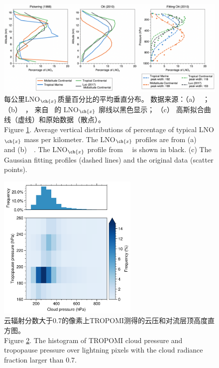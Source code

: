 \begin{figure}[H]
\centering
\includegraphics[width=\textwidth]{./figures/arctic_lnox_profile.png}
\caption{
每公里LNO$_{\ch{x}}$质量百分比的平均垂直分布。
数据来源：（a）\  \citet{Pickering.1998}；（b）\  \citet{Ott.2010}，
来自\  \citet{Luo.2017} 的 LNO$_{\ch{x}}$ 廓线以黑色显示；
（c） 高斯拟合曲线（虚线）和原始数据（散点）。\\
Figure \ref{fig:arctic_lnox_profile}.
Average vertical distributions of percentage of typical LNO$_{\ch{x}}$ mass per kilometer.
The LNO$_{\ch{x}}$ profiles are from (a)\ \ \citet{Pickering.1998} and (b)\ \ \citet{Ott.2010}.
The LNO$_{\ch{x}}$ profile from\ \ \citet{Luo.2017} is shown in black.
(c)  The Gaussian fitting profiles (dashed lines) and the original data (scatter points).
}
\label{fig:arctic_lnox_profile}
\end{figure}

\begin{figure}[H]
\centering
\includegraphics[width=0.6\textwidth]{./figures/pcld_ptropo.png}
\caption{云辐射分数大于0.7的像素上TROPOMI测得的云压和对流层顶高度直方图。\\
Figure \ref{fig:pcld_ptropo}. The histogram of TROPOMI cloud pressure and tropopause pressure over lightning
pixels with the cloud radiance fraction larger than 0.7.
}
\label{fig:pcld_ptropo}
\end{figure}


